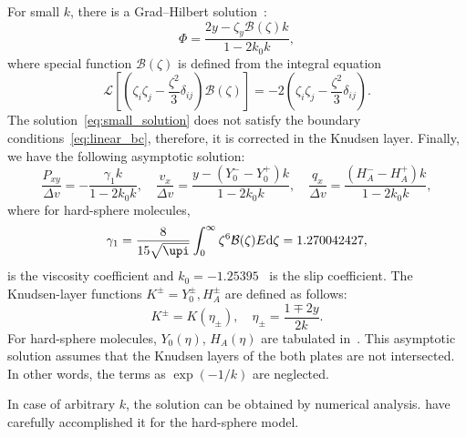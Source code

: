 \documentclass[final]{jfm} %
\newcommand{\dd}{\mathrm{d}}
\begin{document}
For small \(k\), there is a Grad--Hilbert solution~\citep[see e.g.][]{Ohwada1990, Sone2007}:
\begin{equation}\label{eq:small_solution}
    \Phi = \frac{2y - \zeta_y \mathcal{B}(\zeta) k}{1-2k_0k},
\end{equation}
where special function \(\mathcal{B}(\zeta)\) is defined from the integral equation
\begin{equation}\label{eq:transport_B}
    \mathcal{L}\left[\left(\zeta_i\zeta_j-\frac{\zeta^2}3\delta_{ij}\right) \mathcal{B}(\zeta)\right]
        = -2\left(\zeta_i\zeta_j-\frac{\zeta^2}3\delta_{ij}\right).
\end{equation}
The solution~\eqref{eq:small_solution} does not satisfy the boundary conditions~\eqref{eq:linear_bc},
therefore, it is corrected in the Knudsen layer. Finally, we have the following asymptotic solution:
\begin{equation}\label{eq:small_macro}
    \frac{P_{xy}}{\Delta{v}} = - \frac{\gamma_1 k}{1-2k_0k}, \quad
    \frac{v_x}{\Delta{v}} = \frac{y - (Y_0^--Y_0^+)k}{1-2k_0k}, \quad
    \frac{q_x}{\Delta{v}} = \frac{(H_A^--H_A^+)k}{1-2k_0k},
\end{equation}
where for hard-sphere molecules,
\begin{equation}\label{eq:gamma_1}
    \gamma_1 = \frac{8}{15\sqrt{\upi}}\int_0^\infty \zeta^6 \mathcal{B}(\zeta)E\dd\zeta = 1.270042427,
\end{equation}
is the viscosity coefficient and \(k_0 = -1.25395\)~\citep{Takata2015} is the slip coefficient.
The Knudsen-layer functions \(K^\pm = Y_0^\pm, H_A^\pm\) are defined as follows:
\begin{equation}\label{eq:linear_knudsen_functions}
     K^\pm = K(\eta_\pm), \quad \eta_\pm = \frac{1 \mp 2y}{2k}.
\end{equation}
For hard-sphere molecules, \(Y_0(\eta)\), \(H_A(\eta)\)
are tabulated in~\citet{Ohwada1989a, Sone2002, Sone2007, Takata2015}.
This asymptotic solution assumes that the Knudsen layers of the both plates are not intersected.
In other words, the terms as \(\exp(-1/k)\) are neglected.

In case of arbitrary \(k\), the solution can be obtained by numerical analysis.
\citet{Ohwada1990} have carefully accomplished it for the hard-sphere model.
\end{document}
